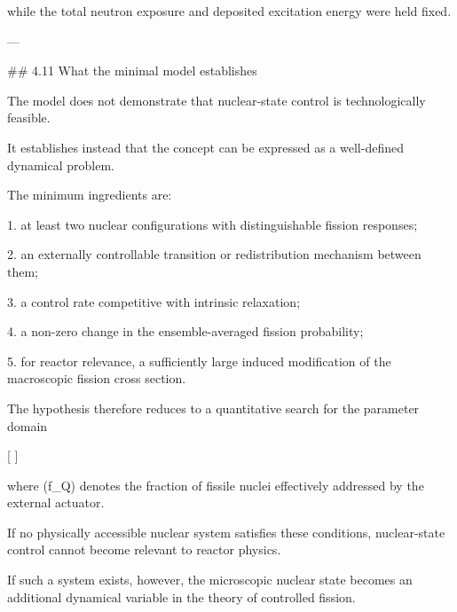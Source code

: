 while the total neutron exposure and deposited excitation energy were held fixed.

---

## 4.11 What the minimal model establishes

The model does not demonstrate that nuclear-state control is technologically feasible.

It establishes instead that the concept can be expressed as a well-defined dynamical problem.

The minimum ingredients are:

1. at least two nuclear configurations with distinguishable fission responses;

2. an externally controllable transition or redistribution mechanism between them;

3. a control rate competitive with intrinsic relaxation;

4. a non-zero change in the ensemble-averaged fission probability;

5. for reactor relevance, a sufficiently large induced modification of the macroscopic fission cross section.

The hypothesis therefore reduces to a quantitative search for the parameter domain

[
]

where (f_Q) denotes the fraction of fissile nuclei effectively addressed by the external actuator.

If no physically accessible nuclear system satisfies these conditions, nuclear-state control cannot become relevant to reactor physics.

If such a system exists, however, the microscopic nuclear state becomes an additional dynamical variable in the theory of controlled fission.
